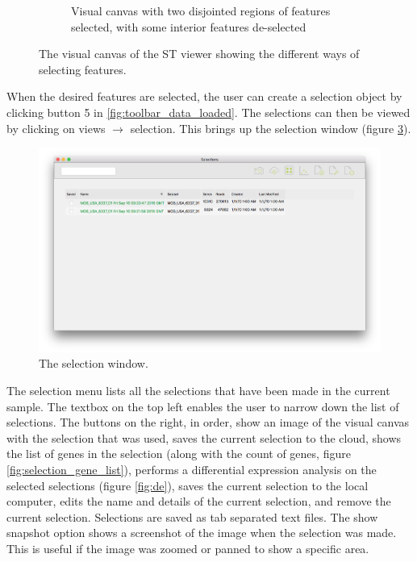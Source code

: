 \documentclass[10pt,a4paper,titlepage]{book}
\begin{document}
\begin{figure}[h]
\begin{subfigure}{0.3\linewidth}
		\caption{Visual canvas with two disjointed regions of features selected, with some interior features de-selected}
		\label{fig:selective_selection}
	\end{subfigure}
	\caption[The visual canvas of the ST viewer showing different selection types.]{The visual canvas of the ST viewer showing the different ways of selecting features.}
\end{figure}

When the desired features are selected, the user can create a selection object by clicking button 5 in \ref{fig:toolbar_data_loaded}. The selections can then be viewed by clicking on views $\rightarrow$ selection. This brings up the selection window (figure \ref{fig:selection_menu}).

\begin{figure}[h!]
	\centering
	\includegraphics[width=0.8\linewidth]{./Pictures/selection_menu}
	\caption{The selection window.}
	\label{fig:selection_menu}
\end{figure}

The selection menu lists all the selections that have been made in the current sample. The textbox on the top left enables the user to narrow down the list of selections. The buttons on the right, in order, show an image of the visual canvas with the selection that was used, saves the current selection to the cloud, shows the list of genes in the selection (along with the count of genes, figure \ref{fig:selection_gene_list}), performs a differential expression analysis on the selected selections (figure \ref{fig:de}), saves the current selection to the local computer, edits the name and details of the current selection, and remove the current selection. Selections are saved as tab separated text files. The show snapshot option shows a screenshot of the image when the selection was made. This is useful if the image was zoomed or panned to show a specific area.
\end{document}
